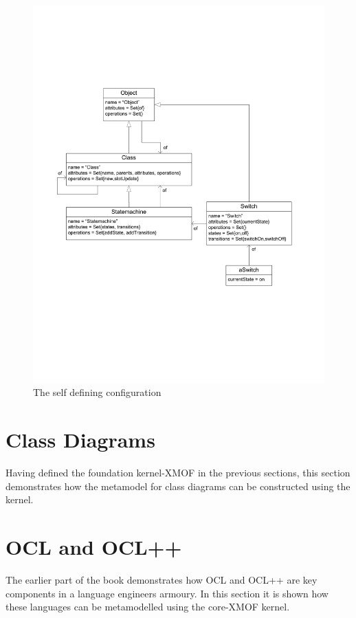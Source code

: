 \begin{figure}
\begin{center}
\includegraphics[width=12cm]{MetaToolArchitecture/figures/moreDetailExample.pdf}
\caption{The self defining configuration}
\label{moreDetailExample}
\end{center}
\end{figure}

\section{Class Diagrams}

Having defined the foundation kernel-XMOF in the previous sections, this section demonstrates how the metamodel for class diagrams can be constructed using the kernel.

\section{OCL and OCL++}

The earlier part of the book demonstrates how OCL and OCL++ are key components in a language engineers armoury.  In this section it is shown how these languages can be metamodelled using the core-XMOF kernel.

